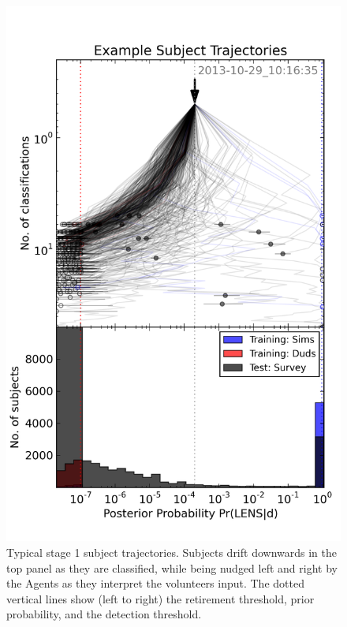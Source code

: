 \documentclass[useAMS,usenatbib,a4paper]{mn2e}
\begin{document}
\begin{figure}
\centering\includegraphics[width=0.9\linewidth]{sw-system-figs/CFHTLS_2013-10-29_10:16:35_trajectories.png}
\caption{Typical \SW stage 1 subject trajectories. Subjects drift downwards in
the top panel as they are classified, while being nudged left and right by the
Agents as they interpret the volunteers input. The dotted vertical lines show
(left to right) the retirement threshold, prior probability, and the detection
threshold.}
\label{fig:swap:subject-trajectories}
\end{figure}
\end{document}
